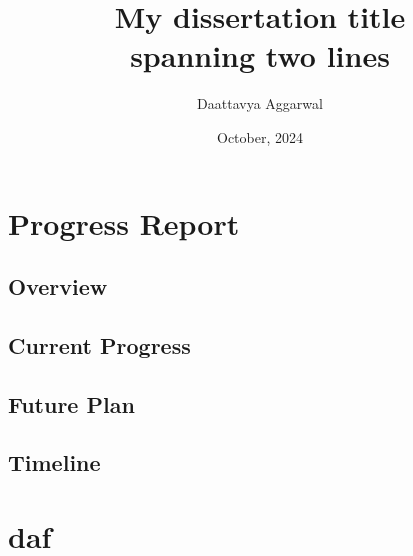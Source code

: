 \documentclass[firstyr, withindex, glossary]{cam-thesis}
\title{My dissertation title\\
spanning two lines}
\author{Daattavya Aggarwal}
\date{October, 2024}
\theoremstyle{definition}
\theoremstyle{remark}
\begin{document}
\frontmatter{}








\chapter{Progress Report}
\section{Overview}
\section{Current Progress}
\section{Future Plan}
\section{Timeline}
%

\renewcommand{\bibname}{Bibliography}
\cleardoublepage
{}
{}






\appendix



\chapter{daf}

\end{document}
